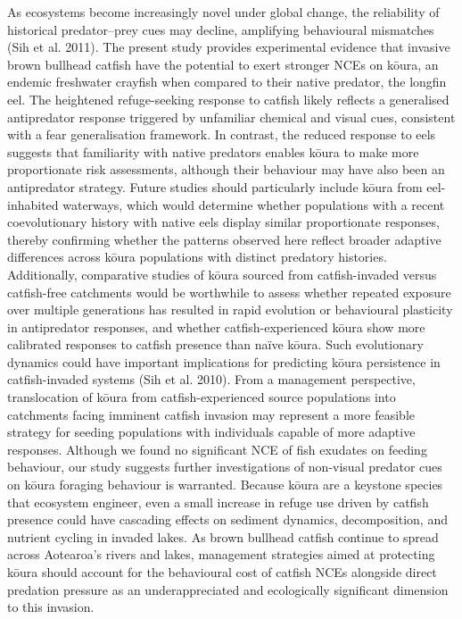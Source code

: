 \documentclass[
  12pt,
  a4paper,
  oneside]{scrbook}
\begin{document}
As ecosystems become increasingly novel under global change, the
reliability of historical predator--prey cues may decline, amplifying
behavioural mismatches (Sih et al. 2011). The present study provides
experimental evidence that invasive brown bullhead catfish have the
potential to exert stronger NCEs on kōura, an endemic freshwater
crayfish when compared to their native predator, the longfin eel. The
heightened refuge-seeking response to catfish likely reflects a
generalised antipredator response triggered by unfamiliar chemical and
visual cues, consistent with a fear generalisation framework. In
contrast, the reduced response to eels suggests that familiarity with
native predators enables kōura to make more proportionate risk
assessments, although their behaviour may have also been an antipredator
strategy. Future studies should particularly include kōura from
eel-inhabited waterways, which would determine whether populations with
a recent coevolutionary history with native eels display similar
proportionate responses, thereby confirming whether the patterns
observed here reflect broader adaptive differences across kōura
populations with distinct predatory histories. Additionally, comparative
studies of kōura sourced from catfish-invaded versus catfish-free
catchments would be worthwhile to assess whether repeated exposure over
multiple generations has resulted in rapid evolution or behavioural
plasticity in antipredator responses, and whether catfish-experienced
kōura show more calibrated responses to catfish presence than naïve
kōura. Such evolutionary dynamics could have important implications for
predicting kōura persistence in catfish-invaded systems (Sih et al.
2010). From a management perspective, translocation of kōura from
catfish-experienced source populations into catchments facing imminent
catfish invasion may represent a more feasible strategy for seeding
populations with individuals capable of more adaptive responses.
Although we found no significant NCE of fish exudates on feeding
behaviour, our study suggests further investigations of non-visual
predator cues on kōura foraging behaviour is warranted. Because kōura
are a keystone species that ecosystem engineer, even a small increase in
refuge use driven by catfish presence could have cascading effects on
sediment dynamics, decomposition, and nutrient cycling in invaded lakes.
As brown bullhead catfish continue to spread across Aotearoa's rivers
and lakes, management strategies aimed at protecting kōura should
account for the behavioural cost of catfish NCEs alongside direct
predation pressure as an underappreciated and ecologically significant
dimension to this invasion.
\end{document}
